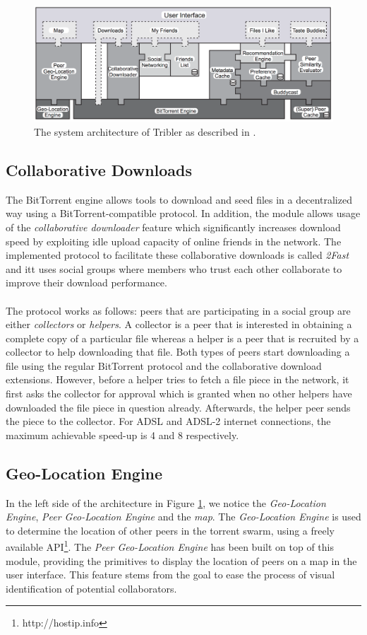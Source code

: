 \begin{figure}[t]
	\centering
	\includegraphics[width=0.9\columnwidth]{images/tribler_architecture_2007}
	\caption{The system architecture of Tribler as described in \cite{pouwelse2008tribler}.}
	\label{fig:tribler-architecture-2008}
\end{figure}

\subsection{Collaborative Downloads}
The BitTorrent engine allows tools to download and seed files in a decentralized way using a BitTorrent-compatible protocol. In addition, the module allows usage of the \emph{collaborative downloader} feature which significantly increases download speed by exploiting idle upload capacity of online friends in the network. The implemented protocol to facilitate these collaborative downloads is called \emph{2Fast} and itt uses social groups where members who trust each other collaborate to improve their download performance.\\\\
The protocol works as follows: peers that are participating in a social group are either \emph{collectors} or \emph{helpers}. A collector is a peer that is interested in obtaining a complete copy of a particular file whereas a helper is a peer that is recruited by a collector to help downloading that file. Both types of peers start downloading a file using the regular BitTorrent protocol and the collaborative download extensions. However, before a helper tries to fetch a file piece in the network, it first asks the collector for approval which is granted when no other helpers have downloaded the file piece in question already. Afterwards, the helper peer sends the piece to the collector. For ADSL and ADSL-2 internet connections, the maximum achievable speed-up is 4 and 8 respectively.

\subsection{Geo-Location Engine}
In the left side of the architecture in Figure \ref{fig:tribler-architecture-2008}, we notice the \emph{Geo-Location Engine}, \emph{Peer Geo-Location Engine} and the \emph{map}. The \emph{Geo-Location Engine} is used to determine the location of other peers in the torrent swarm, using a freely available API\footnote{http://hostip.info}. The \emph{Peer Geo-Location Engine} has been built on top of this module, providing the primitives to display the location of peers on a map in the user interface. This feature stems from the goal to ease the process of visual identification of potential collaborators.

